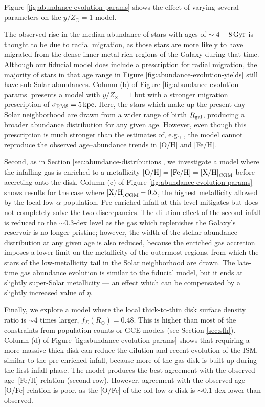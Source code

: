 \documentclass[twocolumn,twocolappendix,linenumbers]{aastex631}
\newcommand{\mathOH}{{\rm [O/H]}}
\newcommand{\mathFeH}{{\rm [Fe/H]}}
\newcommand{\yZ}[1]{$y/Z_\odot=#1$}
\begin{document}
Figure \ref{fig:abundance-evolution-params} shows the effect of varying several parameters on the \yZ{1} model. 

The observed rise in the median abundance of stars with ages of $\sim4-8\,{\rm Gyr}$ is thought to be due to radial migration, as those stars are more likely to have migrated from the dense inner metal-rich regions of the Galaxy during that time. Although our fiducial model does include a prescription for radial migration, the majority of stars in that age range in Figure \ref{fig:abundance-evolution-yields} still have sub-Solar abundances. Column (b) of Figure \ref{fig:abundance-evolution-params} presents a model with $y/Z_\odot=1$ but with a stronger migration prescription of $\sigma_{\rm RM8}=5\,{\rm kpc}$. Here, the stars which make up the present-day Solar neighborhood are drawn from a wider range of birth $R_{\rm gal}$, producing a broader abundance distribution for any given age. However, even though this prescription is much stronger than the estimates of, e.g., \citet{frankel_measuring_2018}, the model cannot reproduce the observed age--abundance trends in [O/H] and [Fe/H].

Second, as in Section \ref{sec:abundance-distributions}, we investigate a model where the infalling gas is enriched to a metallicity $\mathOH=\mathFeH={\rm [X/H]}_{\rm CGM}$ before accreting onto the disk. Column (c) of Figure \ref{fig:abundance-evolution-params} shows results for the case where ${\rm [X/H]}_{\rm CGM}-0.5$, the highest metallicity allowed by the local low-$\alpha$ population. Pre-enriched infall at this level mitigates but does not completely solve the two discrepancies. The dilution effect of the second infall is reduced to the $\sim0.3$-dex level as the gas which replenishes the Galaxy's reservoir is no longer pristine; however, the width of the stellar abundance distribution at any given age is also reduced, because the enriched gas accretion imposes a lower limit on the metallicity of the outermost regions, from which the stars of the low-metallicity tail in the Solar neighborhood are drawn. The late-time gas abundance evolution is similar to the fiducial model, but it ends at slightly super-Solar metallicity --- an effect which can be compensated by a slightly increased value of $\eta$. 

Finally, we explore a model where the local thick-to-thin disk surface density ratio is $\sim4$ times larger, $f_\Sigma(R_\odot)=0.48$. This is higher than most of the constraints from population counts or GCE models (see Section \ref{sec:sfh}). Column (d) of Figure \ref{fig:abundance-evolution-params} shows that requiring a more massive thick disk can reduce the dilution and recent evolution of the ISM, similar to the pre-enriched infall, because more of the gas disk is built up during the first infall phase. The model produces the best agreement with the observed age--[Fe/H] relation (second row). However, agreement with the observed age--[O/Fe] relation is poor, as the [O/Fe] of the old low-$\alpha$ disk is $\sim0.1$ dex lower than observed.
\end{document}
